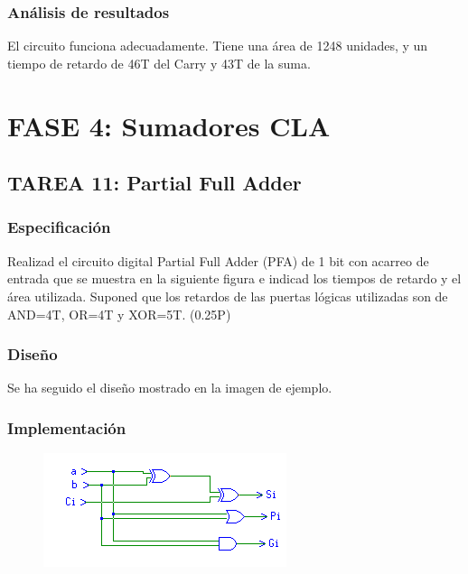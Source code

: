 \documentclass{article}
\begin{document}
		\subsubsection*{Análisis de resultados}
		El circuito funciona adecuadamente. Tiene una área de 1248 unidades, y un tiempo de retardo de 46T del Carry y 43T de la suma.

\section{FASE 4: Sumadores CLA}
	\subsection{TAREA 11: Partial Full Adder}
		\subsubsection*{Especificación}
		Realizad el circuito digital Partial Full Adder (PFA) de 1 bit con acarreo de entrada
		que se muestra en la siguiente figura e indicad los tiempos de retardo y el área utilizada. Suponed
		que los retardos de las puertas lógicas utilizadas son de AND=4T, OR=4T y XOR=5T. (0.25P)


		\subsubsection*{Diseño}
		Se ha seguido el diseño mostrado en la imagen de ejemplo.

		\subsubsection*{Implementación}
		 \begin{figure}[ht]
			\includegraphics[width=0.8\linewidth]{PFA}
		 	\centering
		 \end{figure}
\end{document}
